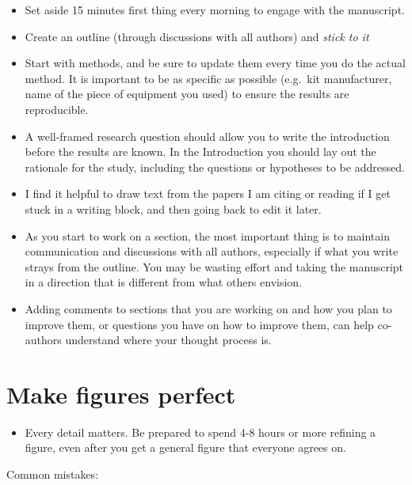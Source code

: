 \documentclass[
  letterpaper,
  DIV=11,
  numbers=noendperiod]{scrreprt}
\providecommand{\tightlist}{%
  \setlength{\itemsep}{0pt}\setlength{\parskip}{0pt}}\usepackage{longtable,booktabs,array}
\begin{document}
\begin{itemize}
\item
  Set aside 15 minutes first thing every morning to engage with the
  manuscript.
\item
  Create an outline (through discussions with all authors) and
  \emph{stick to it}
\item
  Start with methods, and be sure to update them every time you do the
  actual method. It is important to be as specific as possible (e.g.~kit
  manufacturer, name of the piece of equipment you used) to ensure the
  results are reproducible.
\item
  A well-framed research question should allow you to write the
  introduction before the results are known. In the Introduction you
  should lay out the rationale for the study, including the questions or
  hypotheses to be addressed.
\item
  I find it helpful to draw text from the papers I am citing or reading
  if I get stuck in a writing block, and then going back to edit it
  later.
\item
  As you start to work on a section, the most important thing is to
  maintain communication and discussions with all authors, especially if
  what you write strays from the outline. You may be wasting effort and
  taking the manuscript in a direction that is different from what
  others envision.
\item
  Adding comments to sections that you are working on and how you plan
  to improve them, or questions you have on how to improve them, can
  help co-authors understand where your thought process is.
\end{itemize}

\hypertarget{make-figures-perfect}{%
\section*{\texorpdfstring{\textbf{Make figures
perfect}}{Make figures perfect}}\label{make-figures-perfect}}

\begin{itemize}
\tightlist
\item
  Every detail matters. Be prepared to spend 4-8 hours or more refining
  a figure, even after you get a general figure that everyone agrees on.
\end{itemize}

Common mistakes:
\end{document}

